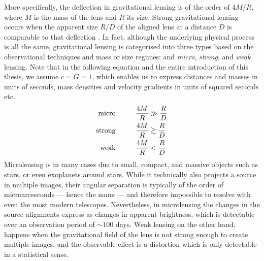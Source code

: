 More specifically, the deflection in gravitational lensing is of the order of
$4M/R$, where $M$ is the mass of the lens and $R$ its size.  Strong
gravitational lensing occurs when the apparent size $R/D$ of the aligned lens at
a distance $D$ is comparable to that deflection .  In fact,
although the underlying physical process is all the same, gravitational lensing
is categorised into three types based on the observational techniques and mass
or size regimes: and \textit{micro}, \textit{strong}, and \textit{weak} lensing.
Note that in the following equation and the entire introduction of this thesis,
we assume $c=G=1$, which enables us to express distances and masses in units of
seconds, mass densities and velocity gradients in units of squared seconds etc.
%
\begin{equation}\eqlbl{lensing_types}%
  \begin{aligned}
    \text{micro} \hspace{1cm}&\frac{4M}{R} \gg \frac{R}{D}\\
    \text{strong} \hspace{1cm}&\frac{4M}{R} \gtrsim \frac{R}{D}\\
    \text{weak} \hspace{1cm}&\frac{4M}{R} < \frac{R}{D}
  \end{aligned}
\end{equation}%
%
Microlensing is in many cases due to small, compact, and massive objects such as
stars, or even exoplanets around stars.  While it technically also projects a
source in multiple images, their angular separation is typically of the order of
microarcseconds --- hence the name --- and therefore impossible to resolve with
even the most modern telescopes. Nevertheless, in microlensing the changes in
the source alignments express as changes in apparent brightness, which is
detectable over an observation period of $\sim100$ days.  Weak lensing on the
other hand, happens when the gravitational field of the lens is not strong
enough to create multiple images, and the observable effect is a distortion
which is only detectable in a statistical sense.

